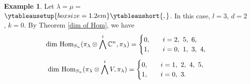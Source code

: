 \documentclass[11pt]{amsart}
\numberwithin{equation}{section}
\theoremstyle{definition}
\newtheorem{example}[thm]{Example}
\begin{document}
\begin{example}
 Let   $\lambda=\mu=$
$
\ytableausetup{boxsize=1.2em} %
\ytableaushort{
  {} {} {} ,
  {} {} {}
}$. In this case, $l=3$, $d=2$, $k=0$. By Theorem \eqref{dim of Hom}, we have
\begin{equation*}
      \textnormal{dim}\ \textnormal{Hom}_{S_{n}}(\pi_{\lambda}\otimes\bigwedge^{i}\mathbb{C}^{n}, \pi_{\lambda})=\begin{cases}
    0,\quad & i=2,\ 5,\ 6,\\
    1,\quad & i=0,\ 1,\ 3,\ 4,
    \end{cases}
\end{equation*}
  \begin{equation*}
      \textnormal{dim}\ \textnormal{Hom}_{S_{n}}(\pi_{\lambda}\otimes\bigwedge^{i}V, \pi_{\lambda})=\begin{cases}
    0,\quad & i=1,\ 2,\ 4,\ 5,\\
    1,\quad & i=0,\ 3.
\end{cases}
\end{equation*}

\end{example}
\end{document}
